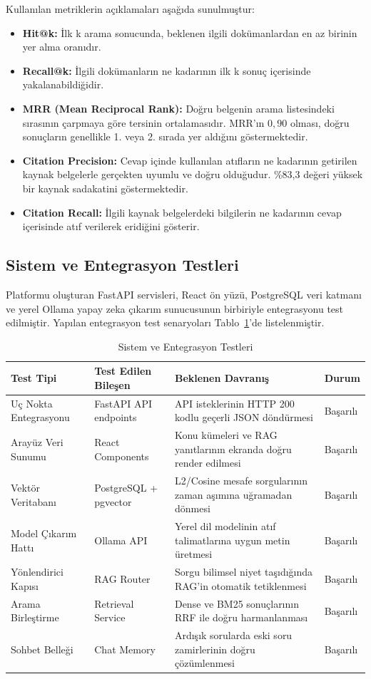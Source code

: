 Kullanılan metriklerin açıklamaları aşağıda sunulmuştur:
\begin{itemize}
    \item \textbf{Hit@k:} İlk k arama sonucunda, beklenen ilgili dokümanlardan en az birinin yer alma oranıdır.
    \item \textbf{Recall@k:} İlgili dokümanların ne kadarının ilk k sonuç içerisinde yakalanabildiğidir.
    \item \textbf{MRR (Mean Reciprocal Rank):} Doğru belgenin arama listesindeki sırasının çarpmaya göre tersinin ortalamasıdır. MRR'ın $0,90$ olması, doğru sonuçların genellikle 1. veya 2. sırada yer aldığını göstermektedir.
    \item \textbf{Citation Precision:} Cevap içinde kullanılan atıfların ne kadarının getirilen kaynak belgelerle gerçekten uyumlu ve doğru olduğudur. \%83,3 değeri yüksek bir kaynak sadakatini göstermektedir.
    \item \textbf{Citation Recall:} İlgili kaynak belgelerdeki bilgilerin ne kadarının cevap içerisinde atıf verilerek eridiğini gösterir.
\end{itemize}

\subsection{Sistem ve Entegrasyon Testleri}
Platformu oluşturan FastAPI servisleri, React ön yüzü, PostgreSQL veri katmanı ve yerel Ollama yapay zeka çıkarım sunucusunun birbiriyle entegrasyonu test edilmiştir. Yapılan entegrasyon test senaryoları Tablo~\ref{tab:entegrasyon_testleri}'de listelenmiştir.

\begin{table}[H]
\centering
\caption{Sistem ve Entegrasyon Testleri}
\label{tab:entegrasyon_testleri}
\begin{tabular}{llp{7cm}l}
\hline
Test Tipi & Test Edilen Bileşen & Beklenen Davranış & Durum \\
\hline
Uç Nokta Entegrasyonu & FastAPI API endpoints & API isteklerinin HTTP 200 kodlu geçerli JSON döndürmesi & Başarılı \\
Arayüz Veri Sunumu & React Components & Konu kümeleri ve RAG yanıtlarının ekranda doğru render edilmesi & Başarılı \\
Vektör Veritabanı & PostgreSQL + pgvector & L2/Cosine mesafe sorgularının zaman aşımına uğramadan dönmesi & Başarılı \\
Model Çıkarım Hattı & Ollama API & Yerel dil modelinin atıf talimatlarına uygun metin üretmesi & Başarılı \\
Yönlendirici Kapısı & RAG Router & Sorgu bilimsel niyet taşıdığında RAG'in otomatik tetiklenmesi & Başarılı \\
Arama Birleştirme & Retrieval Service & Dense ve BM25 sonuçlarının RRF ile doğru harmanlanması & Başarılı \\
Sohbet Belleği & Chat Memory & Ardışık sorularda eski soru zamirlerinin doğru çözümlenmesi & Başarılı \\
\hline
\end{tabular}
\end{table}

